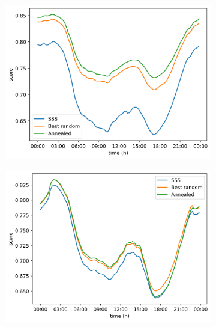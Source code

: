 \begin{figure}[H]
    \begin{subfigure}{.5\textwidth}
      \centering
      \includegraphics[width=\linewidth]{img/switchstate_exploring/suburb2/compare_over_time.png}
      \caption{}
      \label{fig:time:suburb2:sss_vs_optimized}
    \end{subfigure}%
    \begin{subfigure}{.5\textwidth}
        \centering
        \includegraphics[width=\linewidth]{img/switchstate_exploring/urban2/compare_over_time.png}
        \caption{}
        \label{fig:time:urban2:sss_vs_optimized}
    \end{subfigure}
    \caption{}
    \label{fig:time:sss_vs_optimized}
\end{figure}
